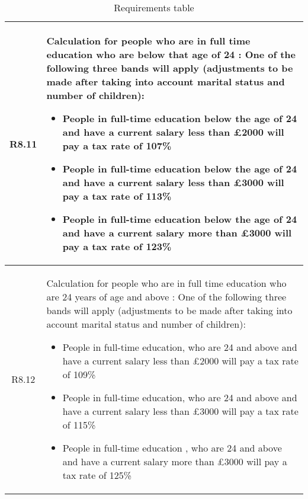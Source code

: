 \begin{table}[H]
\begin{tabularx}{\textwidth}{| c | X |}
    R8.11 & Calculation for people who are in full time education who are below that age of 24 : One of the following three bands will apply (adjustments to be made after taking into account marital status and number of children):
    \begin{itemize}[itemsep=\tableitemsep, leftmargin=\tableleftsep]
        \item People in full-time education below the age of 24 and have a current salary less than £2000 will pay a tax rate of 107\%
        \item People in full-time education below the age of 24 and have a current salary less than £3000 will pay a tax rate of 113\%
        \item People in full-time education below the age of 24 and have a current salary more than £3000 will pay a tax rate of 123\%
    \end{itemize}
    \\
    \hline %
    \label{req:r8-12}
    R8.12 & Calculation for people who are in full time education who are 24 years of age and above : One of the following three bands will apply (adjustments to be made after taking into account marital status and number of children):
    \begin{itemize}[itemsep=\tableitemsep, leftmargin=\tableleftsep]
    \item People in full-time education, who are 24 and above and have a current salary less than £2000 will pay a tax rate of 109\%
    \item People in full-time education, who are 24 and above and have a current salary less than £3000 will pay a tax rate of 115\%
    \item People in full-time education , who are 24 and above and have a current salary more than £3000 will pay a tax rate of 125\%
    \end{itemize}
    \\
    \hline %
\end{tabularx}
\caption{Requirements table}
\end{table}
